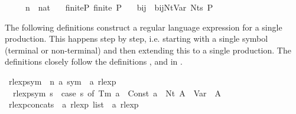\begin{isabellebody}
\ \ \ {\isasymgamma}{\isacharprime}{\kern0pt}\ {\isacharcolon}{\kern0pt}{\isacharcolon}{\kern0pt}\ {\isachardoublequoteopen}{\isacharprime}{\kern0pt}n\ {\isasymRightarrow}\ nat{\isachardoublequoteclose}\isanewline
\ \ \ finite{\isacharunderscore}{\kern0pt}P{\isacharcolon}{\kern0pt}\ {\isachardoublequoteopen}finite\ P{\isachardoublequoteclose}\isanewline
\ \ \ bij{\isacharunderscore}{\kern0pt}{\isasymgamma}{\isacharunderscore}{\kern0pt}{\isasymgamma}{\isacharprime}{\kern0pt}{\isacharcolon}{\kern0pt}\ \ {\isachardoublequoteopen}bij{\isacharunderscore}{\kern0pt}Nt{\isacharunderscore}{\kern0pt}Var\ {\isacharparenleft}{\kern0pt}Nts\ P{\isacharparenright}{\kern0pt}\ {\isasymgamma}\ {\isasymgamma}{\isacharprime}{\kern0pt}{\isachardoublequoteclose}\isanewline
{}%
\begin{isamarkuptext}%
The following definitions construct a regular language expression for a single production. This
happens step by step, i.e. starting with a single symbol (terminal or non-terminal) and then extending
this to a single production. The definitions closely follow the definitions ,
 and  in .%
\end{isamarkuptext}\isamarkuptrue%
\isamarkupfalse%
\ rlexp{\isacharunderscore}{\kern0pt}sym\ {\isacharcolon}{\kern0pt}{\isacharcolon}{\kern0pt}\ {\isachardoublequoteopen}{\isacharparenleft}{\kern0pt}{\isacharprime}{\kern0pt}n{\isacharcomma}{\kern0pt}\ {\isacharprime}{\kern0pt}a{\isacharparenright}{\kern0pt}\ sym\ {\isasymRightarrow}\ {\isacharprime}{\kern0pt}a\ rlexp{\isachardoublequoteclose}\ \isanewline
\ \ {\isachardoublequoteopen}rlexp{\isacharunderscore}{\kern0pt}sym\ s\ {\isacharequal}{\kern0pt}\ {\isacharparenleft}{\kern0pt}case\ s\ of\ Tm\ a\ {\isasymRightarrow}\ Const\ {\isacharbraceleft}{\kern0pt}{\isacharbrackleft}{\kern0pt}a{\isacharbrackright}{\kern0pt}{\isacharbraceright}{\kern0pt}\ {\isacharbar}{\kern0pt}\ Nt\ A\ {\isasymRightarrow}\ Var\ {\isacharparenleft}{\kern0pt}{\isasymgamma}{\isacharprime}{\kern0pt}\ A{\isacharparenright}{\kern0pt}{\isacharparenright}{\kern0pt}{\isachardoublequoteclose}\isanewline
\isanewline
{}\isamarkupfalse%
\ rlexp{\isacharunderscore}{\kern0pt}concats\ {\isacharcolon}{\kern0pt}{\isacharcolon}{\kern0pt}\ {\isachardoublequoteopen}{\isacharprime}{\kern0pt}a\ rlexp\ list\ {\isasymRightarrow}\ {\isacharprime}{\kern0pt}a\ rlexp{\isachardoublequoteclose}\ \isanewline

\end{isabellebody}
